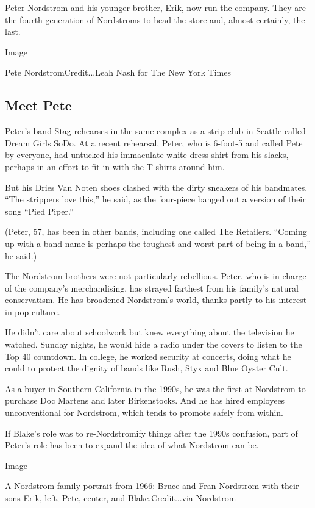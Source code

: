 Peter Nordstrom and his younger brother, Erik, now run the company. They
are the fourth generation of Nordstroms to head the store and, almost
certainly, the last.

Image

Pete NordstromCredit...Leah Nash for The New York Times

\hypertarget{meet-pete}{%
\subsection{Meet Pete}\label{meet-pete}}

Peter's band Stag rehearses in the same complex as a strip club in
Seattle called Dream Girls SoDo. At a recent rehearsal, Peter, who is
6-foot-5 and called Pete by everyone, had untucked his immaculate white
dress shirt from his slacks, perhaps in an effort to fit in with the
T-shirts around him.

But his Dries Van Noten shoes clashed with the dirty sneakers of his
bandmates. ``The strippers love this,'' he said, as the four-piece
banged out a version of their song ``Pied Piper.''

(Peter, 57, has been in other bands, including one called The Retailers.
``Coming up with a band name is perhaps the toughest and worst part of
being in a band,'' he said.)

The Nordstrom brothers were not particularly rebellious. Peter, who is
in charge of the company's merchandising, has strayed farthest from his
family's natural conservatism. He has broadened Nordstrom's world,
thanks partly to his interest in pop culture.

He didn't care about schoolwork but knew everything about the television
he watched. Sunday nights, he would hide a radio under the covers to
listen to the Top 40 countdown. In college, he worked security at
concerts, doing what he could to protect the dignity of bands like Rush,
Styx and Blue Oyster Cult.

As a buyer in Southern California in the 1990s, he was the first at
Nordstrom to purchase Doc Martens and later Birkenstocks. And he has
hired employees unconventional for Nordstrom, which tends to promote
safely from within.

If Blake's role was to re-Nordstromify things after the 1990s confusion,
part of Peter's role has been to expand the idea of what Nordstrom can
be.

Image

A Nordstrom family portrait from 1966: Bruce and Fran Nordstrom with
their sons Erik, left, Pete, center, and Blake.Credit...via Nordstrom

